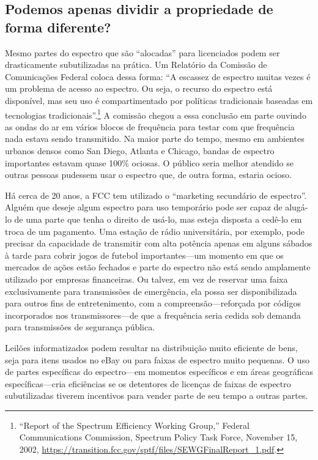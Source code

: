 \documentclass{book}
\begin{document}
\subsection{Podemos apenas dividir a propriedade de forma diferente?}
\label{cap8:os-caminho-podemos}
Mesmo partes do espectro que são ``alocadas'' para licenciados podem ser
drasticamente subutilizadas na prática. Um Relatório da Comissão de Comunicações
Federal coloca dessa forma: ``A escassez de espectro muitas vezes é um problema
de acesso ao espectro. Ou seja, o recurso do espectro está disponível, mas seu
uso é compartimentado por políticas tradicionais baseadas em tecnologias
tradicionais''.\footnote{``Report of the Spectrum Efficiency Working Group,''
Federal Communications Commission, Spectrum Policy Task Force, November 15, 2002,
\url{https://transition.fcc.gov/sptf/files/SEWGFinalReport_1.pdf}.} A comissão
chegou a essa conclusão em parte ouvindo as ondas do ar em vários blocos de
frequência para testar com que frequência nada estava sendo transmitido. Na maior
parte do tempo, mesmo em ambientes urbanos densos como San Diego, Atlanta e
Chicago, bandas de espectro importantes estavam quase 100\% ociosas. O público
seria melhor atendido se outras pessoas pudessem usar o espectro que, de outra
forma, estaria ocioso.

Há cerca de 20 anos, a FCC tem utilizado o ``marketing secundário de espectro''.
Alguém que deseje algum espectro para uso temporário pode ser capaz de alugá-lo
de uma parte que tenha o direito de usá-lo, mas esteja disposta a cedê-lo em
troca de um pagamento. Uma estação de rádio universitária, por exemplo, pode
precisar da capacidade de transmitir com alta potência apenas em alguns sábados
à tarde para cobrir jogos de futebol importantes---um momento em que os mercados
de ações estão fechados e parte do espectro não está sendo amplamente utilizado
por empresas financeiras. Ou talvez, em vez de reservar uma faixa exclusivamente
para transmissões de emergência, ela possa ser disponibilizada para outros fins
de entretenimento, com a compreensão---reforçada por códigos incorporados nos
transmissores---de que a frequência seria cedida sob demanda para transmissões
de segurança pública.

Leilões informatizados podem resultar na distribuição muito eficiente de bens,
seja para itens usados no eBay ou para faixas de espectro muito pequenas. O uso
de partes específicas do espectro---em momentos específicos e em áreas geográficas
específicas---cria eficiências se os detentores de licenças de faixas de espectro
subutilizadas tiverem incentivos para vender parte de seu tempo a outras partes.
\end{document}
